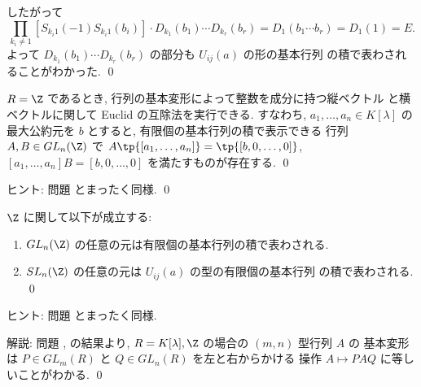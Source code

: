 \documentclass[12pt,twoside]{jarticle}
\begin{document}
したがって
\begin{equation*}
  \prod_{k_i\ne 1} [S_{k_i1}(-1)S_{k_i1}(b_i)]
  \cdot D_{k_1}(b_1)\cdots D_{k_r}(b_r)
  = D_1(b_1\cdots b_r) = D_1(1) = E.
\end{equation*}
よって $D_{k_1}(b_1)\cdots D_{k_r}(b_r)$ の部分も $U_{ij}(a)$ の形の基本行列
の積で表わされることがわかった. 
\qed


\begin{question}
\label{q:elem-transf-Euclid-Z}
  $R=\Z$ であるとき, 行列の基本変形によって整数を成分に持つ縦ベクトル
  と横ベクトルに関して Euclid の互除法を実行できる. 
  すなわち, $a_1,\dots,a_n\in K[\lambda]$ の最大公約元を $b$ とすると, 
  有限個の基本行列の積で表示できる
  行列 $A,B\in GL_n(\Z)$ 
  で $A\tp{[a_1,\dots,a_n]}=\tp{[b,0,\dots,0]}$,  
  $[a_1,\dots,a_n]B=[b,0,\dots,0]$ を満たすものが存在する.
  \qed
\end{question}

\noindent
ヒント: 問題  とまったく同様. \qed


\begin{question}
\label{q:elem-transf-GL_n(Z)}
  $\Z$ に関して以下が成立する:
  \begin{enumerate}
  \item $GL_n(\Z)$ の任意の元は有限個の基本行列の積で表わされる.
  \item $SL_n(\Z)$ の任意の元は $U_{ij}(a)$ の型の有限個の基本行列
    の積で表わされる.
    \qed
  \end{enumerate}
\end{question}

\noindent
ヒント: 問題  とまったく同様.

\medskip
\noindent
解説: 問題 ,  
の結果より, $R=K[\lambda],\Z$ の場合の $(m,n)$ 型行列 $A$ の
基本変形は $P\in GL_m(R)$ と $Q\in GL_n(R)$ を左と右からかける
操作 $A\mapsto PAQ$ に等しいことがわかる.
\qed

\end{document}

